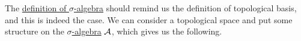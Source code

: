 \begin{note}
	The \hyperref[def:sigma-algebra]{definition of \(\sigma\)-algebra} should remind us the definition of topological basis, and this is indeed the case.
	We can consider a topological space and put some structure on the \hyperref[def:sigma-algebra]{\(\sigma\)-algebra} \(\mathcal{\MakeUppercase{a}} \),
	which gives us the following.
\end{note}


